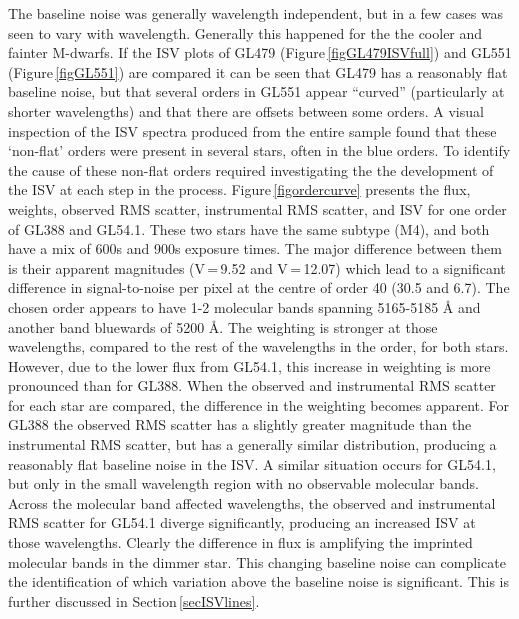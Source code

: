 The baseline noise was generally wavelength independent, but in a few cases was seen to vary with wavelength. Generally this happened for the the cooler and fainter M-dwarfs. If the ISV plots of GL479 (Figure\,\ref{figGL479ISVfull}) and GL551 (Figure\,\ref{figGL551}) are compared it can be seen that GL479 has a reasonably flat baseline noise, but that several orders in GL551 appear ``curved'' (particularly at shorter wavelengths) and that there are offsets between some orders. A visual inspection of the ISV spectra produced from the entire sample found that these `non-flat' orders were present in several stars, often in the blue orders. To identify the cause of these non-flat orders required investigating the the development of the ISV at each step in the process. Figure\,\ref{figordercurve} presents the flux, weights, observed RMS scatter, instrumental RMS scatter, and ISV for one order of GL388 and GL54.1. These two stars have the same subtype (M4), and both have a mix of 600s and 900s exposure times. The major difference between them is their apparent magnitudes (V\,=\,9.52 and V\,=\,12.07) which lead to a significant difference in signal-to-noise per pixel at the centre of order 40 (30.5 and 6.7). The chosen order appears to have 1-2 molecular bands spanning 5165-5185 \hbox{\AA} and another band bluewards of 5200 \hbox{\AA}. The weighting is stronger at those wavelengths, compared to the rest of the wavelengths in the order, for both stars. However, due to the lower flux from GL54.1, this increase in weighting is more pronounced than for GL388. When the observed and instrumental RMS scatter for each star are compared, the difference in the weighting becomes apparent. For GL388 the observed RMS scatter has a slightly greater magnitude than the instrumental RMS scatter, but has a generally similar distribution, producing a reasonably flat baseline noise in the ISV. A similar situation occurs for GL54.1, but only in the small wavelength region with no observable molecular bands. Across the molecular band affected wavelengths, the observed and instrumental RMS scatter for GL54.1 diverge significantly, producing an increased ISV at those wavelengths. Clearly the difference in flux is amplifying the imprinted molecular bands in the dimmer star. This changing baseline noise can complicate the identification of which variation above the baseline noise is significant. This is further discussed in Section\,\ref{secISVlines}.\\

